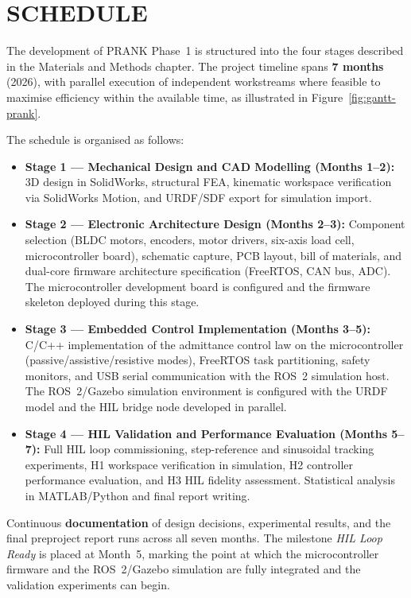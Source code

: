 \chapter{SCHEDULE}\label{schedule}
\graphicspath{{images/}}

The development of PRANK Phase~1 is structured into the four stages described in the Materials and Methods chapter.
The project timeline spans \textbf{7 months} (2026), with parallel execution of independent workstreams where feasible to maximise efficiency within the available time, as illustrated in Figure~\ref{fig:gantt-prank}.

The schedule is organised as follows:

\begin{itemize}
    \item \textbf{Stage 1 — Mechanical Design and CAD Modelling (Months 1--2):}
    3D design in SolidWorks, structural FEA, kinematic workspace verification via SolidWorks Motion, and URDF/SDF export for simulation import.

    \item \textbf{Stage 2 — Electronic Architecture Design (Months 2--3):}
    Component selection (BLDC motors, encoders, motor drivers, six-axis load cell, microcontroller board), schematic capture, PCB layout, bill of materials, and dual-core firmware architecture specification (FreeRTOS, CAN bus, ADC).
    The microcontroller development board is configured and the firmware skeleton deployed during this stage.

    \item \textbf{Stage 3 — Embedded Control Implementation (Months 3--5):}
    C/C++ implementation of the admittance control law on the microcontroller (passive/assistive/resistive modes), FreeRTOS task partitioning, safety monitors, and USB serial communication with the ROS~2 simulation host.
    The ROS~2/Gazebo simulation environment is configured with the URDF model and the HIL bridge node developed in parallel.

    \item \textbf{Stage 4 — HIL Validation and Performance Evaluation (Months 5--7):}
    Full HIL loop commissioning, step-reference and sinusoidal tracking experiments, H1 workspace verification in simulation, H2 controller performance evaluation, and H3 HIL fidelity assessment.
    Statistical analysis in MATLAB/Python and final report writing.
\end{itemize}

Continuous \textbf{documentation} of design decisions, experimental results, and the final preproject report runs across all seven months.
The milestone \textit{HIL Loop Ready} is placed at Month~5, marking the point at which the microcontroller firmware and the ROS~2/Gazebo simulation are fully integrated and the validation experiments can begin.

